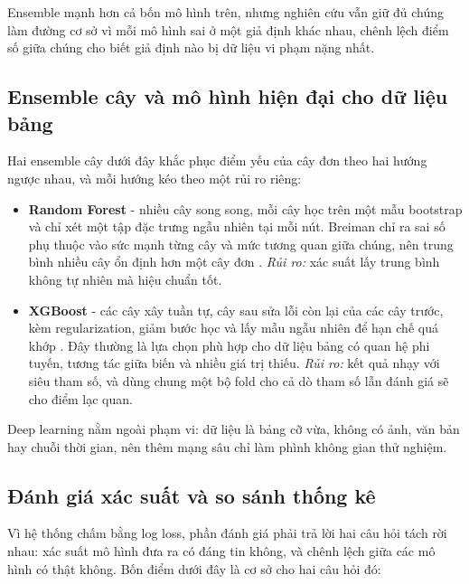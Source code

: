 \documentclass[12pt]{template/ai_conquer2026}
\begin{document}
Ensemble mạnh hơn cả bốn mô hình trên, nhưng nghiên cứu vẫn giữ đủ chúng làm
đường cơ sở vì mỗi mô hình sai ở một giả định khác nhau, chênh lệch điểm số giữa
chúng cho biết giả định nào bị dữ liệu vi phạm nặng nhất.

\subsection{Ensemble cây và mô hình hiện đại cho dữ liệu bảng}
\label{rw:ensemble}

Hai ensemble cây dưới đây khắc phục điểm yếu của cây đơn theo hai hướng ngược nhau,
và mỗi hướng kéo theo một rủi ro riêng:

\begin{itemize}
  \item \textbf{Random Forest} - nhiều cây song song, mỗi cây học trên một mẫu
        bootstrap và chỉ xét một tập đặc trưng ngẫu nhiên tại mỗi nút. Breiman chỉ
        ra sai số phụ thuộc vào sức mạnh từng cây và mức tương quan giữa chúng, nên
        trung bình nhiều cây ổn định hơn một cây đơn \cite{breiman2001random}.
        \emph{Rủi ro:} xác suất lấy trung bình không tự nhiên mà hiệu chuẩn tốt.
  \item \textbf{XGBoost} - các cây xây tuần tự, cây sau sửa lỗi còn lại của các cây
        trước, kèm regularization, giảm bước học và lấy mẫu ngẫu nhiên để hạn chế
        quá khớp \cite{chen2016xgboost}. Đây thường là lựa chọn phù hợp cho dữ liệu
        bảng có quan hệ phi tuyến, tương tác giữa biến và nhiều giá trị thiếu.
        \emph{Rủi ro:} kết quả nhạy với siêu tham số, và dùng chung một bộ fold cho
        cả dò tham số lẫn đánh giá sẽ cho điểm lạc quan.
\end{itemize}

Deep learning nằm ngoài phạm vi: dữ liệu là bảng cỡ vừa, không có ảnh, văn bản hay
chuỗi thời gian, nên thêm mạng sâu chỉ làm phình không gian thử nghiệm.

\subsection{Đánh giá xác suất và so sánh thống kê}
\label{rw:probstat}

Vì hệ thống chấm bằng log loss, phần đánh giá phải trả lời hai câu hỏi tách rời
nhau: xác suất mô hình đưa ra có đáng tin không, và chênh lệch giữa các mô hình có
thật không. Bốn điểm dưới đây là cơ sở cho hai câu hỏi đó:
\end{document}
